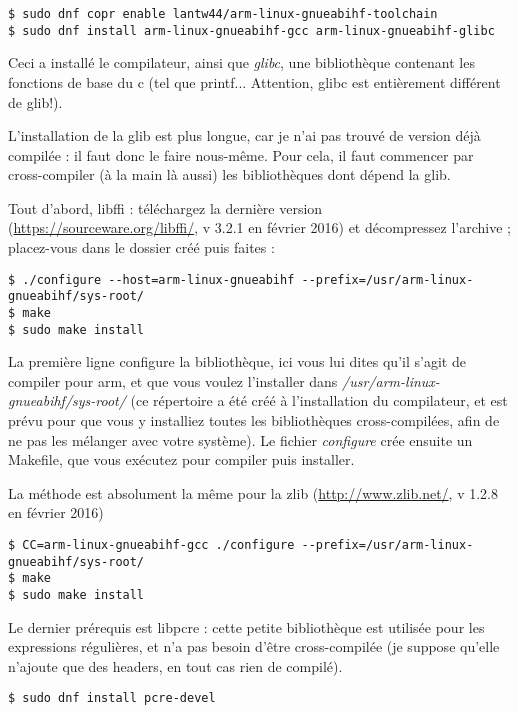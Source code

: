 \documentclass[a4paper,11pt]{article}
\begin{document}
\begin{lstlisting}
$ sudo dnf copr enable lantw44/arm-linux-gnueabihf-toolchain
$ sudo dnf install arm-linux-gnueabihf-gcc arm-linux-gnueabihf-glibc
\end{lstlisting}

\par Ceci a installé le compilateur, ainsi que \emph{glibc}, une bibliothèque contenant les fonctions de base du c (tel que printf... Attention, glibc est entièrement différent de glib!).
\par L'installation de la glib est plus longue, car je n'ai pas trouvé de version déjà compilée : il faut donc le faire nous-même. Pour cela, il faut commencer par cross-compiler (à la main là aussi) les bibliothèques dont dépend la glib.
\par Tout d'abord, libffi : téléchargez la dernière version (\href{https://sourceware.org/libffi/}{https://sourceware.org/libffi/}, v 3.2.1 en février 2016) et décompressez l'archive ; placez-vous dans le dossier créé puis faites :

\begin{lstlisting}[]
$ ./configure --host=arm-linux-gnueabihf --prefix=/usr/arm-linux-gnueabihf/sys-root/
$ make
$ sudo make install
\end{lstlisting}
\par La première ligne configure la bibliothèque, ici vous lui dites qu'il s'agit de compiler pour arm, et que vous voulez l'installer dans \emph{/usr/arm-linux-gnueabihf/sys-root/} (ce répertoire a été créé à l'installation du compilateur, et est prévu pour que vous y installiez toutes les bibliothèques cross-compilées, afin de ne pas les mélanger avec votre système). Le fichier \emph{configure} crée ensuite un Makefile, que vous exécutez pour compiler puis installer.

\par La méthode est absolument la même pour la zlib (\href{http://www.zlib.net/}{http://www.zlib.net/}, v 1.2.8 en février 2016)
\begin{lstlisting}[]
$ CC=arm-linux-gnueabihf-gcc ./configure --prefix=/usr/arm-linux-gnueabihf/sys-root/
$ make
$ sudo make install
\end{lstlisting}

\par Le dernier prérequis est libpcre : cette petite bibliothèque est utilisée pour les expressions régulières, et n'a pas besoin d'être cross-compilée (je suppose qu'elle n'ajoute que des headers, en tout cas rien de compilé). 
\begin{lstlisting}[]
$ sudo dnf install pcre-devel
\end{lstlisting}
\end{document}
